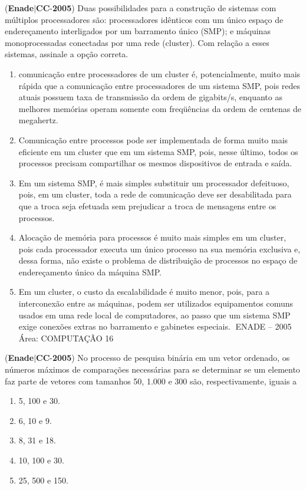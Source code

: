 \documentclass{exam}
\begin{document}
\begin{questions}
\question (\textbf{Enade}$|$\textbf{CC}-\textbf{2005}) Duas possibilidades para a construção de sistemas com múltiplos
processadores são: processadores idênticos com um único espaço de
endereçamento interligados por um barramento único (SMP); e
máquinas monoprocessadas conectadas por uma rede (cluster). Com
relação a esses sistemas, assinale a opção correta.
	\begin{enumerate}[label=\alph*)]
		\item  comunicação entre processadores de um cluster é,
potencialmente, muito mais rápida que a comunicação entre
processadores de um sistema SMP, pois redes atuais possuem
taxa de transmissão da ordem de gigabits/s, enquanto as
melhores memórias operam somente com freqüências da ordem
de centenas de megahertz.
		\item  Comunicação entre processos pode ser implementada de forma
muito mais eficiente em um cluster que em um sistema SMP,
pois, nesse último, todos os processos precisam compartilhar os
mesmos dispositivos de entrada e saída.
		\item  Em um sistema SMP, é mais simples substituir um processador
defeituoso, pois, em um cluster, toda a rede de comunicação
deve ser desabilitada para que a troca seja efetuada sem
prejudicar a troca de mensagens entre os processos.
		\item  Alocação de memória para processos é muito mais simples em
um cluster, pois cada processador executa um único processo na
sua memória exclusiva e, dessa forma, não existe o problema de
distribuição de processos no espaço de endereçamento único da
máquina SMP.
		\item  Em um cluster, o custo da escalabilidade é muito menor, pois,
para a interconexão entre as máquinas, podem ser utilizados
equipamentos comuns usados em uma rede local de
computadores, ao passo que um sistema SMP exige conexões
extras no barramento e gabinetes especiais.
ENADE – 2005 Área: COMPUTAÇÃO 16

	\end{enumerate}

\question (\textbf{Enade}$|$\textbf{CC}-\textbf{2005}) No processo de pesquisa binária em um vetor ordenado, os
números máximos de comparações necessárias para se
determinar se um elemento faz parte de vetores com tamanhos
50, 1.000 e 300 são, respectivamente, iguais a
	\begin{enumerate}[label=\alph*)]
		\item  5, 100 e 30.
		\item  6, 10 e 9.
		\item  8, 31 e 18.
		\item  10, 100 e 30.
		\item  25, 500 e 150.


\end{enumerate}
\end{questions}
\end{document}
